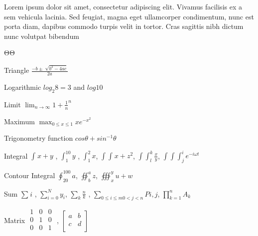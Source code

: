 \documentclass{book}
\begin{document}
Lorem ipsum dolor sit amet, consectetur adipiscing elit. Vivamus facilisis ex a sem vehicula lacinia. Sed feugiat, magna eget ullamcorper condimentum, nunc est porta diam, dapibus commodo turpis velit in tortor. Cras sagittis nibh dictum nunc volutpat bibendum 

ΘΘ

Triangle $\frac{-b\pm \sqrt[]{{b}^{2}-4ac}}{2a}$

Logarithmic ${log}_{2}8=3$ and $log10$

Limit $\lim_{n\rightarrow \infty }{1+\frac{1}{n}}^{n}$

Maximum $\max_{0\leq x\leq 1}x{e}^{-{x}^{2}}$

Trigonometry function $cos\theta + {sin}^{-1}\theta $

Integral $\int_{}^{}x+y$ , $\int_{1}^{10}y$ , $\int_{1}^{2}x$, $\int\!\int _{}^{}x+{z}^{2}$, $\int\!\int _{l}^{k}\frac{x}{y}$, $\int\!\int\!\int _{j}^{i}{e}^{-i\omega t}$

Contour Integral $\oint _{20}^{100}a$, $\oiint _{b}^{a}z$, $\oiiint _{x}^{y}u+w$

Sum $\sum _{}^{}i$ , $\sum _{i=0}^{N}{y}_{i}$, $\sum _{k}^{}\frac{n}{k}$ , $\sum _{0\leq  i \leq  m0<j<n }^{}Pi,j$, $\prod _{k=1}^{n}{A}_{k}$

Matrix $\begin{matrix}
1 & 0 & 0 \\
0 & 1 & 0 \\
0 & 0 & 1 \\
\end{matrix}
$ , $\begin{bmatrix}
a & b \\
c & d \\
\end{bmatrix}
$
\end{document}
